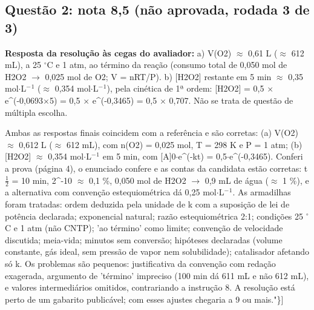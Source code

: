 \documentclass{article}%
\begin{document}
\subsection*{Questão 2: nota 8,5 (não aprovada, rodada 3 de 3)}%
\textbf{Resposta da resolução às cegas do avaliador:} a) V(O2) $\approx$ 0,61 L ($\approx$ 612 mL), a 25 $^\circ$C e 1 atm, ao término da reação (consumo total de 0,050 mol de H2O2 $\to$ 0,025 mol de O2; V = nRT/P).\newline%
\newline%
b) {[}H2O2{]} restante em 5 min $\approx$ 0,35 mol$\cdot$L$^{-}$$^{1}$ ($\approx$ 0,354 mol$\cdot$L$^{-}$$^{1}$), pela cinética de 1ª ordem: {[}H2O2{]} = 0,5 $\times$ e\^{}(-0,0693$\times$5) = 0,5 $\times$ e\^{}(-0,3465) = 0,5 $\times$ 0,707.\newline%
\newline%
Não se trata de questão de múltipla escolha.\par %
Ambas as respostas finais coincidem com a referência e são corretas: (a) V(O2) $\approx$ 0,612 L ($\approx$ 612 mL), com n(O2) = 0,025 mol, T = 298 K e P = 1 atm; (b) {[}H2O2{]} $\approx$ 0,354 mol$\cdot$L$^{-}$$^{1}$ em 5 min, com {[}A{]}0$\cdot$e\^{}(-kt) = 0,5$\cdot$e\^{}(-0,3465). Conferi a prova (página 4), o enunciado confere e as contas da candidata estão corretas: t$\frac12$ = 10 min, 2\^{}-10 $\approx$ 0,1 \%, 0,050 mol de H2O2 $\to$ 0,9 mL de água ($\approx$ 1 \%), e a alternativa com convenção estequiométrica dá 0,25 mol$\cdot$L$^{-}$$^{1}$. As armadilhas foram tratadas: ordem deduzida pela unidade de k com a suposição de lei de potência declarada; exponencial natural; razão estequiométrica 2:1; condições 25 $^\circ$C e 1 atm (não CNTP); 'ao término' como limite; convenção de velocidade discutida; meia{-}vida; minutos sem conversão; hipóteses declaradas (volume constante, gás ideal, sem pressão de vapor nem solubilidade); catalisador afetando só k. Os problemas são pequenos: justificativa da convenção com redação exagerada, argumento de 'término' impreciso (100 min dá 611 mL e não 612 mL), e valores intermediários omitidos, contrariando a instrução 8. A resolução está perto de um gabarito publicável; com esses ajustes chegaria a 9 ou mais."\}{]}%
\end{document}
